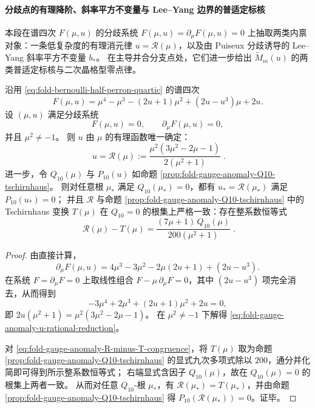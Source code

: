 \paragraph{分歧点的有理降阶、斜率平方不变量与 Lee--Yang 边界的普适定标核}
本段在谱四次 \(F(\mu,u)\) 的分歧系统
\(
F(\mu,u)=\partial_\mu F(\mu,u)=0
\)
上抽取两类内禀对象：一条低复杂度的有理消元律 \(u=\mathcal R(\mu)\)，以及由 Puiseux 分歧诱导的 Lee--Yang 斜率平方不变量 \(b_\ast\)。
在主导并合分支点处，它们进一步给出 \(\widetilde M_m(u)\) 的两类普适定标核与二次晶格型零点律。

\begin{proposition}\label{prop:fold-gauge-anomaly-branchpoint-rational-reduction}
沿用 \eqref{eq:fold-bernoulli-half-perron-quartic} 的谱四次
\[
F(\mu,u)=\mu^4-\mu^3-(2u+1)\mu^2+(2u-u^3)\mu+2u.
\]
设 \((\mu,u)\) 满足分歧系统
\[
F(\mu,u)=0,\qquad \partial_\mu F(\mu,u)=0,
\]
并且 \(\mu^2\neq -1\)。
则 \(u\) 由 \(\mu\) 的有理函数唯一确定：
\begin{equation}\label{eq:fold-gauge-anomaly-u-rational-reduction}
\boxed{\;
u=\mathcal R(\mu):=\frac{\mu^2(3\mu^2-2\mu-1)}{2(\mu^2+1)}\; }.
\end{equation}
进一步，令 \(Q_{10}(\mu)\) 与 \(P_{10}(u)\) 如命题 \ref{prop:fold-gauge-anomaly-Q10-tschirnhaus}。
则对任意根 \(\mu_\ast\) 满足 \(Q_{10}(\mu_\ast)=0\)，都有 \(u_\ast=\mathcal R(\mu_\ast)\) 满足 \(P_{10}(u_\ast)=0\)；
并且 \(\mathcal R\) 与命题 \ref{prop:fold-gauge-anomaly-Q10-tschirnhaus} 中的 Tschirnhaus 变换 \(T(\mu)\) 在 \(Q_{10}=0\) 的根集上严格一致：存在整系数恒等式
\begin{equation}\label{eq:fold-gauge-anomaly-R-minus-T-congruence}
\boxed{\;
\mathcal R(\mu)-T(\mu)=\frac{(7\mu+1)\,Q_{10}(\mu)}{200(\mu^2+1)}\; }.
\end{equation}
\end{proposition}
\begin{proof}
由直接计算，
\[
\partial_\mu F(\mu,u)=4\mu^3-3\mu^2-2\mu(2u+1)+(2u-u^3).
\]
在系统 \(F=\partial_\mu F=0\) 上取线性组合 \(F-\mu\,\partial_\mu F=0\)，其中 \((2u-u^3)\) 项完全消去，从而得到
\[
-3\mu^4+2\mu^3+(2u+1)\mu^2+2u=0,
\]
即
\(
2u(\mu^2+1)=\mu^2(3\mu^2-2\mu-1)
\)。
在 \(\mu^2\neq -1\) 下解得 \eqref{eq:fold-gauge-anomaly-u-rational-reduction}。
\par
对 \eqref{eq:fold-gauge-anomaly-R-minus-T-congruence}，将 \(T(\mu)\) 取为命题 \ref{prop:fold-gauge-anomaly-Q10-tschirnhaus} 的显式九次多项式除以 \(200\)，通分并化简即可得到所示整系数恒等式；
右端显式含因子 \(Q_{10}(\mu)\)，故在 \(Q_{10}(\mu)=0\) 的根集上两者一致。
从而对任意 \(Q_{10}\)-根 \(\mu_\ast\)，有 \(\mathcal R(\mu_\ast)=T(\mu_\ast)\)，并由命题 \ref{prop:fold-gauge-anomaly-Q10-tschirnhaus} 得 \(P_{10}(\mathcal R(\mu_\ast))=0\)。证毕。
\end{proof}

